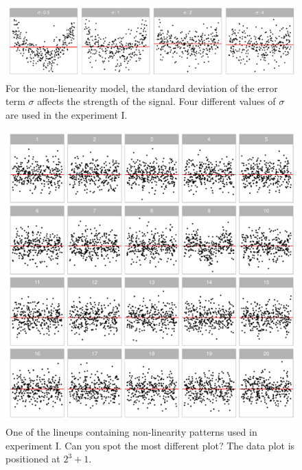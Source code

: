 \documentclass[]{interact}
\theoremstyle{plain}%
\theoremstyle{definition}
\theoremstyle{remark}
\begin{document}
\begin{figure}

{\centering \includegraphics[width=1\linewidth]{paper_comparison_files/figure-latex/different-sigma-1} 

}

\caption{For the non-lienearity model, the standard deviation of the error term $\sigma$ affects the strength of the signal. Four different values of $\sigma$ are used in the experiment I.}\label{fig:different-sigma}
\end{figure}

\begin{figure}

{\centering \includegraphics[width=1\linewidth]{paper_comparison_files/figure-latex/example-poly-lineup-1} 

}

\caption{One of the lineups containing non-linearity patterns used in experiment I. Can you spot the most different plot? The data plot is positioned at $2^3 + 1$.}\label{fig:example-poly-lineup}
\end{figure}
\end{document}
